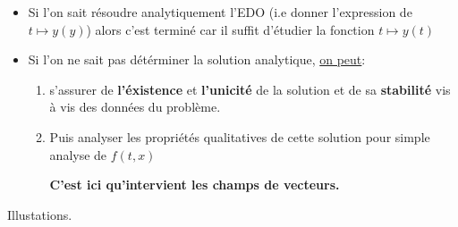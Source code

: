 \begin{itemize}
    \item Si l'on sait résoudre analytiquement l'EDO (i.e donner l'expression de $t \mapsto y(y)$) alors c'est terminé car il suffit d'étudier la fonction $t \mapsto y(t)$
    \item Si l'on ne sait pas détérminer la solution analytique, \underline{on peut}:
        \begin{enumerate}
            \item s'assurer de \textbf{l'éxistence} et \textbf{l'unicité} de la solution et de sa \textbf{stabilité} vis à vis des données du problème.
            \item Puis analyser les propriétés qualitatives de cette solution pour simple analyse de $f(t, x)$
                \begin{center}
                    \textbf{C'est ici qu'intervient les champs de vecteurs.} 
                \end{center}
        \end{enumerate}
\end{itemize}
Illustations.
